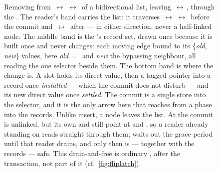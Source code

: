 \begin{figure}[t]
\begin{tikzpicture}
\end{tikzpicture}
\caption{Removing  from
\,$\leftrightarrow$\,\,$\leftrightarrow$\, of a
bidirectional list, leaving \,$\leftrightarrow$\,, through the
\fliplatch. The reader's band carries the list: it traverses
\,$\leftrightarrow$\,\,$\leftrightarrow$\, before the
commit and \,$\leftrightarrow$\, after --- in either direction,
never a half-linked node. The middle band is the \pseudotxn's record set, drawn
once because it is built once and never changes: each moving edge bound to its
\{\textit{old},\,\textit{new}\} values, here \textit{old}\,$=$\, and
\textit{new} the bypassing neighbour, all reading the one selector beside them.
The bottom band is where the change is. A slot holds its direct value, then a
tagged pointer into a record once \emph{installed} --- which the commit does not
disturb --- and its new direct value once \emph{settled}. The commit is a single
store into the selector, and it is the only arrow here that reaches from a phase
into the records. Unlike insert, a node leaves the list. At the commit 
is unlinked, but its own  and  still point at  and
, so a reader already standing on  reads straight through them;
 waits out the grace period until that reader drains, and
only then is  --- together with the records --- safe. This
drain-and-free is ordinary \rcu, after the transaction, not part of it
(cf.\ \cref{fig:fliplatch}).}
\label{fig:listremove}
\end{figure}
